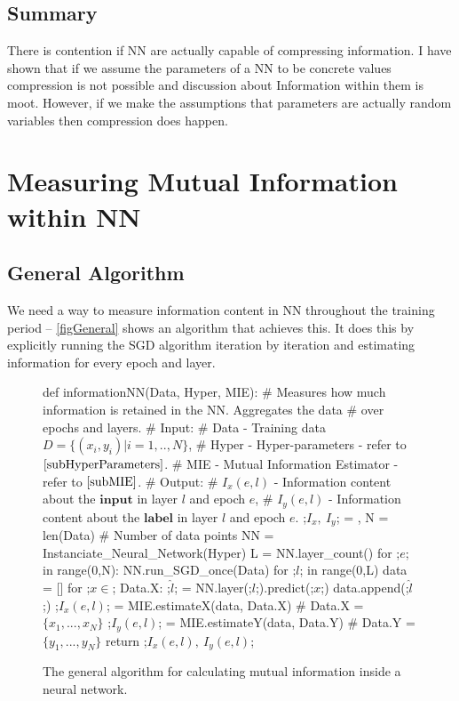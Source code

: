 \documentclass[dissertation.tex]{subfiles}
\begin{document}
\subsection{Summary}

There is contention if NN are actually capable of compressing information. 
I have shown that if we assume the parameters of a NN to be concrete values
compression is not possible and discussion about Information within them is
moot. However, if we make the assumptions that parameters are actually random
variables then compression does happen.

\section{Measuring Mutual Information within NN}

\subsection{General Algorithm}

We need a way to measure information content in NN throughout the training
period -- \autoref{figGeneral} shows an algorithm that achieves this. It does
this by explicitly running the SGD algorithm iteration by iteration and
estimating information for every epoch and layer.

\begin{figure}[H]
    \begin{pythonfigure}
      def informationNN(Data, Hyper, MIE):
      # Measures how much information is retained in the NN. Aggregates the data
      # over epochs and layers.
      # Input:
      # Data  - Training data $D=\{(x_i, y_i)|i=1,..,N\}$,
      # Hyper - Hyper-parameters - refer to $\autoref{subHyperParameters}$.
      # MIE   - Mutual Information Estimator - refer to $\autoref{subMIE}$.
      # Output:
      # $I_x(e, l)$ - Information content about the $\textbf{input}$ in layer $l$ and epoch $e$,
      # $I_y(e, l)$ - Information content about the $\textbf{label}$  in layer $l$ and epoch $e$.
      ;$I_x,\ I_y$; = {}, {}
      N = len(Data) # Number of data points
      NN = Instanciate_Neural_Network(Hyper)
      L = NN.layer_count()
      for ;$e$; in range(0,N):
        NN.run_SGD_once(Data)
        for ;$l$; in range(0,L)
          data = []
          for ;$x\in$; Data.X:
            ;$\hat{l}$; = NN.layer(;$l$;).predict(;$x$;)
            data.append(;$\hat{l}$;)
          ;$I_x(e,l)$; = MIE.estimateX(data, Data.X) # Data.X = $\{x_1,...,x_N\}$
          ;$I_y(e,l)$; = MIE.estimateY(data, Data.Y) # Data.Y = $\{y_1,...,y_N\}$
      return ;$I_x(e,l),\ I_y(e,l)$;
    \end{pythonfigure}
    \caption{The general algorithm for calculating mutual information inside a
    neural network.}
    \label{figGeneral}
\end{figure}
\end{document}
